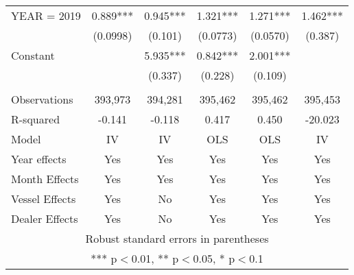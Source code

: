 \begin{tabular}{lccccc}
YEAR = 2019 & 0.889*** & 0.945*** & 1.321*** & 1.271*** & 1.462*** \\
 & (0.0998) & (0.101) & (0.0773) & (0.0570) & (0.387) \\
Constant &  & 5.935*** & 0.842*** & 2.001*** &  \\
 &  & (0.337) & (0.228) & (0.109) &  \\
 &  &  &  &  &  \\
Observations & 393,973 & 394,281 & 395,462 & 395,462 & 395,453 \\
R-squared & -0.141 & -0.118 & 0.417 & 0.450 & -20.023 \\
Model & IV & IV & OLS & OLS & IV \\
Year effects & Yes & Yes & Yes & Yes & Yes \\
Month Effects & Yes & Yes & Yes & Yes & Yes \\
Vessel Effects & Yes & No & Yes & Yes & Yes \\
 Dealer Effects & Yes & No & Yes & Yes & Yes \\ \hline
\multicolumn{6}{c}{ Robust standard errors in parentheses} \\
\multicolumn{6}{c}{ *** p$<$0.01, ** p$<$0.05, * p$<$0.1} \\
\end{tabular}

